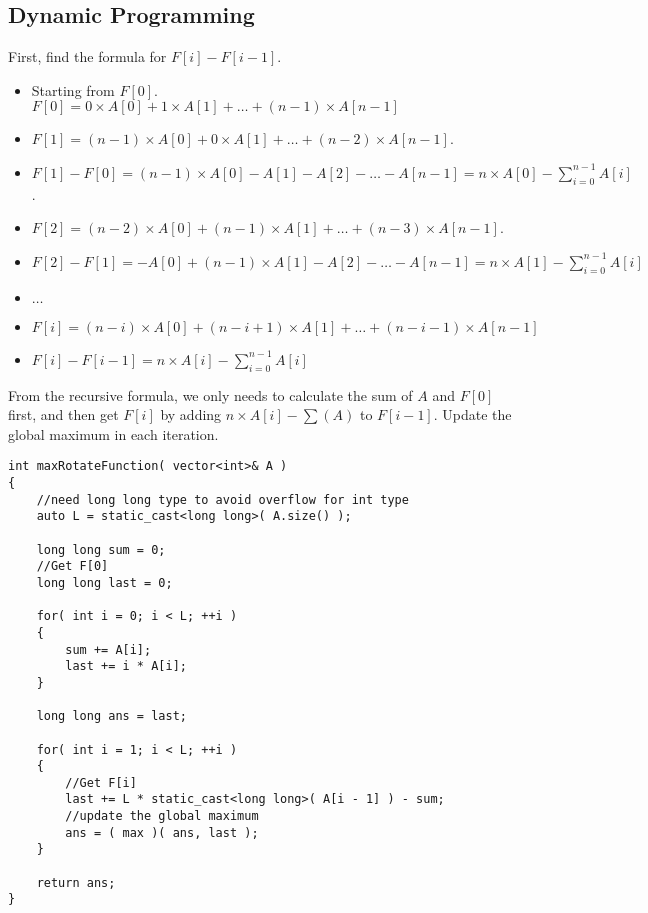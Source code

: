 \subsection{Dynamic Programming}
First, find the formula for $F[i] - F[i-1]$. 
\begin{itemize}
\item Starting from $F[0]$. $F[0] = 0\times A[0] + 1\times A[1] + \ldots + (n-1)\times A[n-1]$
\item $F[1] = (n-1)\times A[0] + 0\times A[1] + \ldots + (n-2)\times A[n-1]$.
\item $F[1] - F[0] = (n-1)\times A[0] - A[1] - A[2] - \ldots - A[n-1] = n\times A[0] - \sum\limits_{i=0}^{n-1}A[i]$. 
\item $F[2] = (n-2)\times A[0] + (n-1)\times A[1] + \ldots + (n-3)\times A[n-1]$.
\item $F[2] - F[1] = -A[0] + (n-1)\times A[1] - A[2] - \ldots - A[n-1] = n\times A[1] - \sum\limits_{i=0}^{n-1}A[i]$
\item $\ldots$
\item $F[i] = (n-i) \times A[0] + (n-i+1) \times A[1] + \ldots + (n-i-1)\times A[n-1]$
\item $F[i] - F[i-1] = n\times A[i] - \sum\limits_{i=0}^{n-1}A[i]$
\end{itemize}
From the recursive formula, we only needs to calculate the sum of $A$ and $F[0]$ first, and then get $F[i]$ by adding $n\times A[i] - \sum(A)$ to $F[i-1]$. Update the global maximum in each iteration.

\setcounter{lstlisting}{0}
\begin{lstlisting}[style=customc, caption={Dynamic Programming}]
int maxRotateFunction( vector<int>& A )
{
    //need long long type to avoid overflow for int type
    auto L = static_cast<long long>( A.size() );

    long long sum = 0;
    //Get F[0]
    long long last = 0;

    for( int i = 0; i < L; ++i )
    {
        sum += A[i];
        last += i * A[i];
    }

    long long ans = last;

    for( int i = 1; i < L; ++i )
    {
        //Get F[i]
        last += L * static_cast<long long>( A[i - 1] ) - sum;
        //update the global maximum
        ans = ( max )( ans, last );
    }

    return ans;
}
\end{lstlisting}